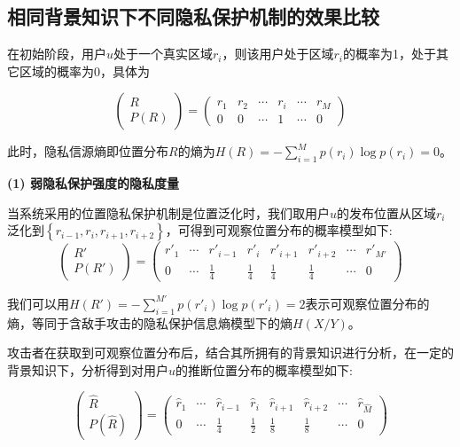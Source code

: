 \subsection{相同背景知识下不同隐私保护机制的效果比较}\label{4.2}

在初始阶段，用户$u$处于一个真实区域$r_{i}$，则该用户处于区域$r_{i}$的概率为1，处于其它区域的概率为0，具体为

\begin{equation}
\begin{pmatrix}
R\\ 
P(R)
\end{pmatrix}=\begin{pmatrix}
r_{1} & r_{2} & \cdots  & r_{i} & \cdots  & r_{M}\\ 
0 & 0 & \cdots  & 1 & \cdots  & 0
\end{pmatrix}
\end{equation}

此时，隐私信源熵即位置分布$R$的熵为$H(R)=-\sum_{i=1}^{M}p(r_{i})\log p(r_{i})=0$。

\textbf{(1) 弱隐私保护强度的隐私度量}

当系统采用的位置隐私保护机制是位置泛化时，我们取用户$u$的发布位置从区域$r_{i}$泛化到$\left \{ r_{i-1},r_{i},r_{i+1},r_{i+2} \right \}$，可得到可观察位置分布的概率模型如下:
\begin{equation}
\begin{pmatrix}
{R}'\\ 
P({R}')
\end{pmatrix}=\begin{pmatrix}
{r}'_{1} & \cdots  & {r}'_{i-1} & {r}'_{i} & {r}'_{i+1}  & {r}'_{i+2} & \cdots & {r}'_{{M}'} \\ 
0 & \cdots & \frac{1}{4} & \frac{1}{4} & \frac{1}{4}  & \frac{1}{4} & \cdots & 0
\end{pmatrix}
\end{equation}

我们可以用$H({R}')=-\sum_{i=1}^{{M}'}p({r}'_{i})\log p({r}'_{i})=2$表示可观察位置分布的熵，等同于含敌手攻击的隐私保护信息熵模型下的熵$H(X/Y)$。

攻击者在获取到可观察位置分布后，结合其所拥有的背景知识进行分析，在一定的背景知识下，分析得到对用户$u$的推断位置分布的概率模型如下:

\begin{equation}
\begin{pmatrix}
\hat{R}\\ 
P(\hat{R})
\end{pmatrix}=\begin{pmatrix}
\hat{r}_{1} & \cdots  & \hat{r}_{i-1} & \hat{r}_{i} & \hat{r}_{i+1}  & \hat{r}_{i+2} & \cdots & \hat{r}_{\hat{M}} \\ 
0 & \cdots & \frac{1}{4} & \frac{1}{2} & \frac{1}{8}  & \frac{1}{8} & \cdots & 0
\end{pmatrix}
\end{equation}

